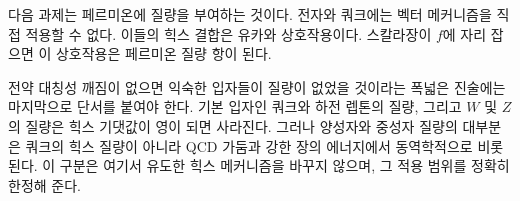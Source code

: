 다음 과제는 페르미온에 질량을 부여하는 것이다. 전자와 쿼크에는 벡터 메커니즘을 직접 적용할 수 없다. 이들의 힉스 결합은 유카와 상호작용이다. 스칼라장이 \(f\)에 자리 잡으면 이 상호작용은 페르미온 질량 항이 된다.

전약 대칭성 깨짐이 없으면 익숙한 입자들이 질량이 없었을 것이라는 폭넓은 진술에는 마지막으로 단서를 붙여야 한다. 기본 입자인 쿼크와 하전 렙톤의 질량, 그리고 \(W\) 및 \(Z\)의 질량은 힉스 기댓값이 영이 되면 사라진다. 그러나 양성자와 중성자 질량의 대부분은 쿼크의 힉스 질량이 아니라 QCD 가둠과 강한 장의 에너지에서 동역학적으로 비롯된다. 이 구분은 여기서 유도한 힉스 메커니즘을 바꾸지 않으며, 그 적용 범위를 정확히 한정해 준다.
